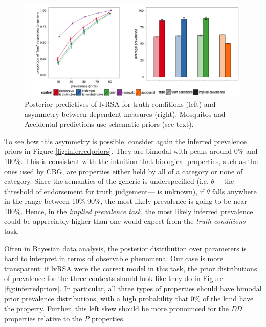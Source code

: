 \documentclass[10pt,letterpaper]{article}
\begin{document}

\begin{figure}
\centering
    \includegraphics[width=\columnwidth]{lvRSA_postpreds_wSims}
    \caption{Posterior predictives of lvRSA for truth conditions (left) and asymmetry between dependent measures (right). Mosquitos and Accidental predictions use schematic priors (see text).}
  \label{fig:lvRSAposteriorpred}
\end{figure}


To see how this asymmetry is possible, consider again the inferred prevalence priors in Figure \ref{fig:inferredpriors}. They are bimodal with peaks around 0\% and 100\%. This is consistent with the intuition that biological properties, such as the ones used by CBG, are properties either held by all of a category or none of category. Since the semantics of the generic is underspecified (i.e. $\theta$ ---the threshold of endorsement for truth judgement--- is unknown), if $\theta$ falls anywhere in the range between 10\%-90\%, the most likely prevalence is going to be near 100\%. Hence, in the \emph{implied prevalence task}, the most likely inferred prevalence could be appreciably higher than one would expect from the \emph{truth conditions} task. 





Often in Bayesian data analysis, the posterior distribution over parameters is hard to interpret in terms of observable phenomena. Our case is more transparent: if lvRSA were the correct model in this task, the prior distributions of prevalence for the three contexts should look like they do in Figure \ref{fig:inferredpriors}. 
In particular, all three types of properties should have bimodal prior prevalence distributions, with a high probability that 0\% of the kind have the property. Further, this left skew should be more pronounced for the \emph{DD} properties relative to the \emph{P} properties. 
\end{document}
